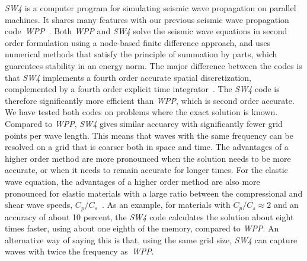 \documentclass[11pt]{report}
\begin{document}
\emph{SW4} is a computer program for simulating seismic wave propagation on parallel machines. It
shares many features with our previous seismic wave propagation code~\emph{WPP}~\cite{WPP2}. Both
\emph{WPP} and \emph{SW4} solve the seismic wave equations in second order formulation using a
node-based finite difference approach, and uses numerical methods that satisfy the principle of
summation by parts, which guarentees stability in an energy norm. The major difference between the
codes is that \emph{SW4} implements a fourth order accurate spatial discretization, complemented by
a fourth order explicit time integrator~\cite{SjoPet-12}. The \emph{SW4} code is therefore
significantly more efficient than \emph{WPP}, which is second order accurate. We have tested both
codes on problems where the exact solution is known. Compared to \emph{WPP}, \emph{SW4} gives
similar accuarcy with significantly fewer grid points per wave length. This means that waves with
the same frequency can be resolved on a grid that is coarser both in space and time. The advantages
of a higher order method are more pronounced when the solution needs to be more accurate, or when it
needs to remain accurate for longer times. For the elastic wave equation, the advantages of a higher
order method are also more pronounced for elastic materials with a large ratio between the
compressional and shear wave speeds, $C_p/C_s$~\cite{KrePet-12}. As an example, for materials with $C_p/C_s\approx 2$
and an accuracy of about 10 percent, the \emph{SW4} code calculates the solution about eight times
faster, using about one eighth of the memory, compared to \emph{WPP}. An alternative way of saying
this is that, using the same grid size, \emph{SW4} can capture waves with twice the frequency as~\emph{WPP}.
\end{document}
